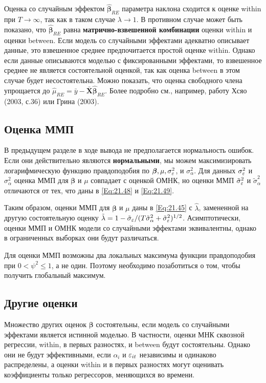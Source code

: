 Оценка со случайным эффектом $\hat{\bm\beta}_{RE}$ параметра наклона сходится к оценке within при $T \rightarrow \infty$, так как в таком случае $\lambda \rightarrow 1$. В противном случае может быть показано, что $\hat{\bm\beta}_{RE}$ равна \textbf{матрично-взвешенной комбинации} оценки within и оценки between. Если модель со случайными эффектами адекватно описывает данные, это взвешенное среднее предпочитается простой оценке within. Однако если данные описываются  моделью с фиксированными эффектами, то взвешенное среднее не является состоятельной оценкой, так как оценка between в этом случае будет несостоятельна. Можно показать, что оценка свободного члена упрощается до $\hat{\mu}_{RE}=\bar{y}-\bar{\mathbf X}\hat{\bm\beta}_{RE}$. Более подробно см., например, работу Хсяо (2003, с.36) или Грина (2003).


\subsection{Оценка ММП}

В предыдущем разделе в ходе вывода не предполагается нормальность ошибок. Если они действительно являются \textbf{нормальными}, мы можем максимизировать логарифмическую функцию правдоподобия по $\bm\beta, \mu, \sigma^2_\varepsilon$, и $\sigma^2_{\alpha}$. Для данных  $\sigma^2_\varepsilon$ и $\sigma^2_{\alpha}$ оценка ММП для $\bm\beta$  и $\mu$ совпадает с оценкой ОМНК, но оценки ММП $\tilde{\sigma}^2_\varepsilon$ и $\tilde{\sigma}^2_{\alpha}$ отличаются от тех, что даны в \ref{Eq:21.48} и \ref{Eq:21.49}. 

Таким образом, оценки ММП для $\bm\beta$ и $\mu$ даны в \ref{Eq:21.45} с $\hat{\lambda}$, замененной на другую состоятельную оценку $\tilde{\lambda}=1-\tilde{\sigma}_\varepsilon/(T\tilde{\sigma}^2_\alpha+\tilde{\sigma}^2_\varepsilon)^{1/2}$. Асимптотически, оценки ММП и ОМНК модели со случайными эффектами эквивалентны, однако в ограниченных выборках они будут различаться.

Для оценки ММП возможны два локальных максимума функции правдоподобия при $0 < \psi^2 \leq 1$, а не один. Поэтому необходимо позаботиться о том, чтобы получить глобальный максимум.


\subsection{Другие оценки}

Множество других оценок $\bm\beta$ состоятельны, если модель со случайными эффектами является истинной моделью. В частности, оценки МНК сквозной регрессии, within, в первых разностях, и between будут состоятельны. Однако они не будут эффективными, если $\alpha_i$ и $\varepsilon_{it}$ независимы и одинаково распределены, а оценки within и в первых разностях могут оценивать коэффициенты только  регрессоров, меняющихся во времени.

